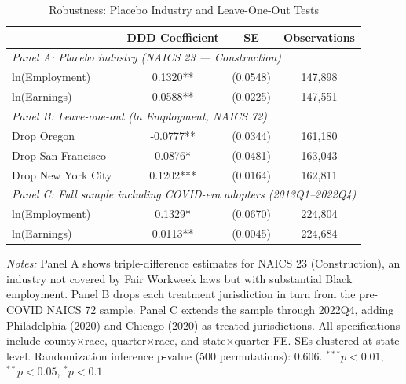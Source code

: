 \begin{table}[htbp]
\centering
\caption{Robustness: Placebo Industry and Leave-One-Out Tests}
\label{tab:robustness}
\begin{tabular}{lccc}
\hline\hline
 & DDD Coefficient & SE & Observations \\
\hline
\multicolumn{4}{l}{\textit{Panel A: Placebo industry (NAICS 23 --- Construction)}} \\[3pt]
ln(Employment) & 0.1320** & (0.0548) & 147,898 \\
ln(Earnings) & 0.0588** & (0.0225) & 147,551 \\
\hline
\multicolumn{4}{l}{\textit{Panel B: Leave-one-out (ln Employment, NAICS 72)}} \\[3pt]
Drop Oregon & -0.0777** & (0.0344) & 161,180 \\
Drop San Francisco & 0.0876* & (0.0481) & 163,043 \\
Drop New York City & 0.1202*** & (0.0164) & 162,811 \\
\hline
\multicolumn{4}{l}{\textit{Panel C: Full sample including COVID-era adopters (2013Q1--2022Q4)}} \\[3pt]
ln(Employment) & 0.1329* & (0.0670) & 224,804 \\
ln(Earnings) & 0.0113** & (0.0045) & 224,684 \\
\hline\hline
\end{tabular}
\begin{tablenotes}
\small
\item \textit{Notes:} Panel A shows triple-difference estimates for NAICS 23 (Construction), an industry 
not covered by Fair Workweek laws but with substantial Black employment. Panel B drops each treatment 
jurisdiction in turn from the pre-COVID NAICS 72 sample. Panel C extends the sample through 2022Q4, 
adding Philadelphia (2020) and Chicago (2020) as treated jurisdictions. All specifications include 
county$\times$race, quarter$\times$race, and state$\times$quarter FE. SEs clustered at state level. 
Randomization inference p-value (500 permutations): 0.606.
 $^{***}p<0.01$, $^{**}p<0.05$, $^{*}p<0.1$.
\end{tablenotes}
\end{table}
